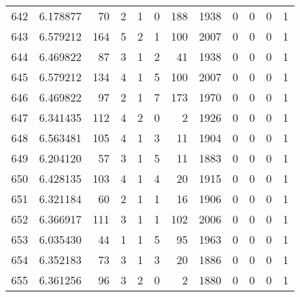 \begin{tabular}{lrrrrrrrrrrr}
642 &  6.178877 &   70 &      2 &        1 &      0 &             188 &  1938 &               0 &               0 &               0 &               1 \\
643 &  6.579212 &  164 &      5 &        2 &      1 &             100 &  2007 &               0 &               0 &               0 &               1 \\
644 &  6.469822 &   87 &      3 &        1 &      2 &              41 &  1938 &               0 &               0 &               0 &               1 \\
645 &  6.579212 &  134 &      4 &        1 &      5 &             100 &  2007 &               0 &               0 &               0 &               1 \\
646 &  6.469822 &   97 &      2 &        1 &      7 &             173 &  1970 &               0 &               0 &               0 &               1 \\
647 &  6.341435 &  112 &      4 &        2 &      0 &               2 &  1926 &               0 &               0 &               0 &               1 \\
648 &  6.563481 &  105 &      4 &        1 &      3 &              11 &  1904 &               0 &               0 &               0 &               1 \\
649 &  6.204120 &   57 &      3 &        1 &      5 &              11 &  1883 &               0 &               0 &               0 &               1 \\
650 &  6.428135 &  103 &      4 &        1 &      4 &              20 &  1915 &               0 &               0 &               0 &               1 \\
651 &  6.321184 &   60 &      2 &        1 &      1 &              16 &  1906 &               0 &               0 &               0 &               1 \\
652 &  6.366917 &  111 &      3 &        1 &      1 &             102 &  2006 &               0 &               0 &               0 &               1 \\
653 &  6.035430 &   44 &      1 &        1 &      5 &              95 &  1963 &               0 &               0 &               0 &               1 \\
654 &  6.352183 &   73 &      3 &        1 &      3 &              20 &  1886 &               0 &               0 &               0 &               1 \\
655 &  6.361256 &   96 &      3 &        2 &      0 &               2 &  1880 &               0 &               0 &               0 &               1 \\

\end{tabular}
